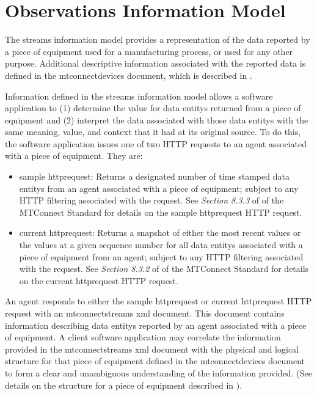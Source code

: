 
\section{Observations Information Model}
\label{sec:Observations Information Model}
The \gls{streams information model} provides a representation of the data reported by a piece of equipment used for a manufacturing process, or used for any other purpose.  Additional descriptive information associated with the reported data is defined in the \gls{mtconnectdevices} document, which is described in .

Information defined in the \gls{streams information model} allows a software application to (1) determine the value for \glspl{data entity} returned from a piece of equipment and (2) interpret the data associated with those \glspl{data entity} with the same meaning, value, and context that it had at its original source.  To do this, the software application issues one of two HTTP requests to an \gls{agent} associated with a piece of equipment.  They are:


\begin{itemize}
\item \gls{sample httprequest}:  Returns a designated number of time stamped \glspl{data entity} from an \gls{agent} associated with a piece of equipment; subject to any HTTP filtering associated with the request.  See \textit{Section 8.3.3} of  of the MTConnect Standard for details on the \gls{sample httprequest} HTTP request.

\item \gls{current httprequest}:  Returns a snapshot of either the most recent values or the values at a given sequence number for all \glspl{data entity} associated with a piece of equipment from an \gls{agent}; subject to any HTTP filtering associated with the request.  See \textit{Section 8.3.2} of  of the MTConnect Standard for details on the \gls{current httprequest} HTTP request.
\end{itemize}

An \gls{agent} responds to either the \gls{sample httprequest} or \gls{current httprequest} HTTP request with an \linebreak\gls{mtconnectstreams} \gls{xml} document.  This document contains information describing \glspl{data entity} reported by an \gls{agent} associated with a piece of equipment.   A client software application may correlate the information provided in the \gls{mtconnectstreams} \gls{xml} document with the physical and logical structure for that piece of equipment defined in the \gls{mtconnectdevices} document to form a clear and unambiguous understanding of the information provided.  (See details on the structure for a piece of equipment described in ).


